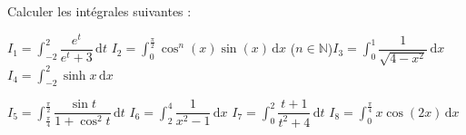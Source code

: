 
\begin{exercice}\label{exoautoanalyseCTU-27}


Calculer les intégrales suivantes : 

$I_{1}=\displaystyle\int_{-2}^{2}\dfrac{e^t}{e^t+3}\,\mathrm dt$  \hfill$I_{2}=\displaystyle\int_{0}^{\frac{\pi}{2}}\cos^n (x)\sin(x)\,\mathrm dx$ \; ($n \in \mathbb{N}$)\hfill$I_{3}=\displaystyle\int_{0}^{1}\dfrac{1}{\sqrt{4-x^2}}\,\mathrm dx$\hfill $I_{4}=\displaystyle\int_{-2}^{2}\sinh x \,\mathrm dx$



$I_{5}=\displaystyle\int_{\frac{\pi}{4}}^{\frac{\pi}{2}}\dfrac{\sin t}{1+\cos^2 t}\,\mathrm dt$ \hfill$I_{6}=\displaystyle\int_{2}^{4}\dfrac{1}{x^2-1}\,\mathrm dx$ \hfill$I_{7}=\displaystyle\int_{0}^{2}\dfrac{t+1}{t^2+4}\,\mathrm dt$
\hfill$I_{8}=\displaystyle\int_{0}^{\frac{\pi}{4}}x\cos(2x)\,\mathrm dx$




\end{exercice}
